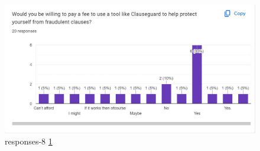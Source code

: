 \begin{figure}[H]
    \centering
    \includegraphics[scale=0.43]{Figures/responses-8.jpg}
    \caption{responses-8 \ref{fig::responses-8}}
    \label{fig::responses-8}
\end{figure}


